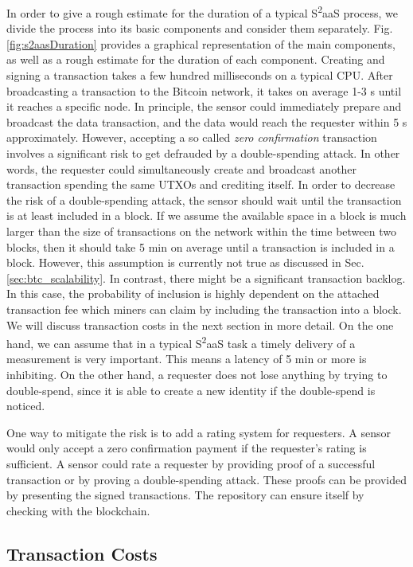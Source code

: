 In order to give a rough estimate for the duration of a typical S\textsuperscript{2}aaS process, we divide the process into its basic components and consider them separately. Fig. \ref{fig:s2aasDuration} provides a graphical representation of the main components, as well as a rough estimate for the duration of each component. Creating and signing a transaction takes a few hundred milliseconds on a typical CPU. After broadcasting a transaction to the Bitcoin network, it takes on average 1-3 s until it reaches a specific node. In principle, the sensor could immediately prepare and broadcast the data transaction, and the data would reach the requester within 5 s approximately. However, accepting a so called \emph{zero confirmation} transaction involves a significant risk to get defrauded by a double-spending attack. In other words, the requester could simultaneously create and broadcast another transaction spending the same \ac{UTXO}s and crediting itself.
In order to decrease the risk of a double-spending attack, the sensor should wait until the transaction is at least included in a block. If we assume the available space in a block is much larger than the size of transactions on the network within the time between two blocks, then it should take 5 min on average until a transaction is included in a block. However, this assumption is currently not true as discussed in Sec. \ref{sec:btc_scalability}. In contrast, there might be a significant transaction backlog. In this case, the probability of inclusion is highly dependent on the attached transaction fee which miners can claim by including the transaction into a block. We will discuss transaction costs in the next section in more detail.
On the one hand, we can assume that in a typical S\textsuperscript{2}aaS task a timely delivery of a measurement is very important. This means a latency of 5 min or more is inhibiting. On the other hand, a requester does not lose anything by trying to double-spend, since it is able to create a new identity if the double-spend is noticed. 

One way to mitigate the risk is to add a rating system for requesters. A sensor would only accept a zero confirmation payment if the requester's rating is sufficient. A sensor could rate a requester by providing proof of a successful transaction or by proving a double-spending attack. These proofs can be provided by presenting the signed transactions. The repository can ensure itself by checking with the blockchain. 

\subsection{Transaction Costs}
\label{sec:s2aas_eval_tc}

